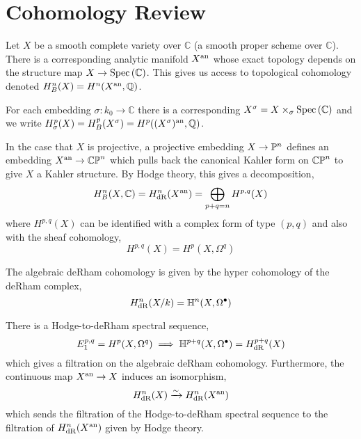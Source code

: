 \documentclass[12pt]{article}
\begin{document}
\section{Cohomology Review}

\renewcommand{\C}{\mathbb{C}}
\newcommand{\Hyper}{\mathbb{H}}
\newcommand{\R}{\mathbb{R}}


\begin{definition}
Let $X$ be a smooth complete variety over $\C$ (a smooth proper scheme over $\C$). There is a corresponding analytic manifold $X^{\an}$ whose exact topology depends on the structure map $X \to \Spec{\C}$. This gives us access to topological cohomology denoted $H_B^n(X) = H^{n}(X^\an, \Q)$. 
\end{definition}

\begin{definition}
For each embedding $\sigma : k_0 \to \C$ there is a corresponding $X^\sigma = X \times_\sigma \Spec{\C}$ and we write $H^p_\sigma(X) = H^p_B(X^\sigma) = H^p((X^\sigma)^\an, \Q)$. 
\end{definition}

\begin{remark}
In the case that $X$ is projective, a projective embedding $X \to \P^n$ defines an embedding $X^\an \to \CP^n$ which pulls back the canonical Kahler form on $\CP^n$ to give $X$ a Kahler structure. By Hodge theory, this gives a decomposition,
\[ H_B^n(X, \C) = H_{\dR}^n(X^\an) = \bigoplus_{p + q = n} H^{p,q}(X) \]
where $H^{p,q}(X)$ can be identified with a complex form of type $(p,q)$ and also with the sheaf cohomology,
\[ H^{p,q}(X) = H^p(X, \Omega^q) \]
\end{remark}

\begin{definition}
The algebraic deRham cohomology is given by the hyper cohomology of the deRham complex,
\[ H^n_\dR(X / k) = \Hyper^n(X, \Omega^\bullet) \]
\end{definition}

\begin{theorem}
There is a Hodge-to-deRham spectral sequence,
\[ E^{p,q}_1 = H^p(X, \Omega^q) \implies \Hyper^{p+q}(X, \Omega^\bullet) = H^{p + q}_{\dR}(X) \]
which gives a filtration on the algebraic deRham cohomology. Furthermore, the continuous map $X^\an \to X$ induces an isomorphism,
\[ H^n_\dR(X) \xrightarrow{\sim} H^n_{\dR}(X^\an) \]
which sends the filtration of the Hodge-to-deRham spectral sequence to the filtration of $H^n_{\dR}(X^\an)$ given by Hodge theory. 
\end{theorem}
\end{document}
